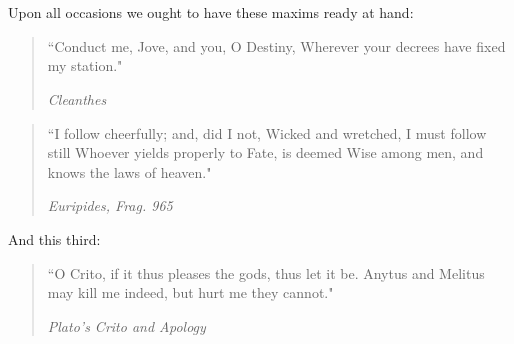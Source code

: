 \documentclass[12pt]{article}
\begin{document}
\section{}

Upon all occasions we ought to have these maxims ready at hand: 

\begin{quote}
``Conduct me, Jove, and you, O Destiny, 
Wherever your decrees have fixed my station." 
\par
\emph{Cleanthes}
\end{quote}

\begin{quote}
``I follow cheerfully; and, did I not, 
Wicked and wretched, I must follow still 
Whoever yields properly to Fate, is deemed 
Wise among men, and knows the laws of heaven."
\par
\emph{Euripides, Frag. 965} 
\end{quote}

And this third: 

\begin{quote}
``O Crito, if it thus pleases the gods, thus let it be. Anytus and Melitus 
may kill me indeed, but hurt me they cannot." 
\par
\emph{Plato's Crito and Apology} 
\end{quote}
\end{document}
